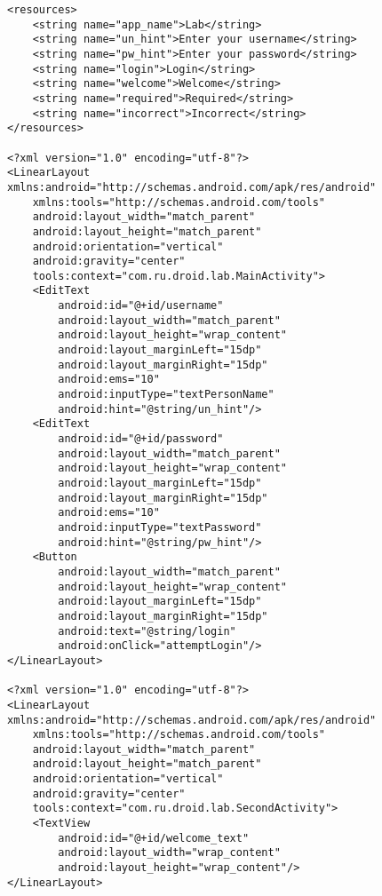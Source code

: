\begin{lstlisting}[style=A_XML, caption={Layouts for simple login}, label={listing:loginxml}]
<resources>
    <string name="app_name">Lab</string>
    <string name="un_hint">Enter your username</string>
    <string name="pw_hint">Enter your password</string>
    <string name="login">Login</string>
    <string name="welcome">Welcome</string>
    <string name="required">Required</string>
    <string name="incorrect">Incorrect</string>
</resources>

<?xml version="1.0" encoding="utf-8"?>
<LinearLayout xmlns:android="http://schemas.android.com/apk/res/android"
    xmlns:tools="http://schemas.android.com/tools"
    android:layout_width="match_parent"
    android:layout_height="match_parent"
    android:orientation="vertical"
    android:gravity="center"
    tools:context="com.ru.droid.lab.MainActivity">
    <EditText
        android:id="@+id/username"
        android:layout_width="match_parent"
        android:layout_height="wrap_content"
        android:layout_marginLeft="15dp"
        android:layout_marginRight="15dp"
        android:ems="10"
        android:inputType="textPersonName"
        android:hint="@string/un_hint"/>
    <EditText
        android:id="@+id/password"
        android:layout_width="match_parent"
        android:layout_height="wrap_content"
        android:layout_marginLeft="15dp"
        android:layout_marginRight="15dp"
        android:ems="10"
        android:inputType="textPassword"
        android:hint="@string/pw_hint"/>
    <Button
        android:layout_width="match_parent"
        android:layout_height="wrap_content"
        android:layout_marginLeft="15dp"
        android:layout_marginRight="15dp"
        android:text="@string/login"
        android:onClick="attemptLogin"/>
</LinearLayout>

<?xml version="1.0" encoding="utf-8"?>
<LinearLayout xmlns:android="http://schemas.android.com/apk/res/android"
    xmlns:tools="http://schemas.android.com/tools"
    android:layout_width="match_parent"
    android:layout_height="match_parent"
    android:orientation="vertical"
    android:gravity="center"
    tools:context="com.ru.droid.lab.SecondActivity">
    <TextView
        android:id="@+id/welcome_text"
        android:layout_width="wrap_content"
        android:layout_height="wrap_content"/>
</LinearLayout>
\end{lstlisting}

